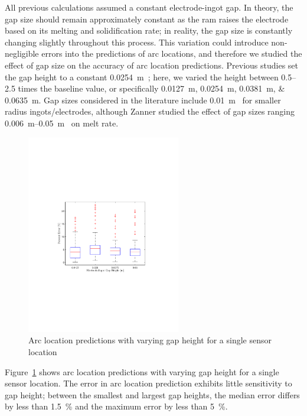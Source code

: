 \documentclass[onehalf,11pt]{beavtex}
\begin{document}
All previous calculations assumed a constant electrode-ingot gap.
In theory, the gap size should remain approximately constant as the ram raises the electrode based on its melting and solidification rate; in reality, the gap size is constantly changing slightly throughout this process.
This variation could introduce non-negligible errors into the predictions of arc locations, and therefore we studied the effect of gap size on the accuracy of arc location predictions.
Previous studies set the gap height to a constant \SI{0.0254}{\meter}~\cite{Woodside:2010fi,Woodside:2013cf}; here, we varied the height between \numrange{0.5}{2.5} times the baseline value, or specifically \SIlist{0.0127;0.0254;0.0381;0.0635}{\meter}.
Gap sizes considered in the literature include \SI{0.01}{\meter}~\cite{Nair:2009ja,Beaman:2014fi} for smaller radius ingots\slash electrodes, although Zanner studied the effect of gap sizes ranging \SIrange{0.006}{0.05}{\meter}~\cite{Zanner:1984cf} on melt rate.

\begin{figure}[htbp]
	\centering
	\includegraphics[width=0.6\textwidth]{gap_height_error.pdf}
	\caption{Arc location predictions with varying gap height for a single sensor location}
	\label{fig:compar}
\end{figure}

Figure~\ref{fig:compar} shows arc location predictions with varying gap height for a single sensor location. 
The error in arc location prediction exhibits little sensitivity to gap height; between the smallest and largest gap heights, the median error differs by less than \SI{1.5}{\percent} and the maximum error by less than \SI{5}{\percent}.
\end{document}
